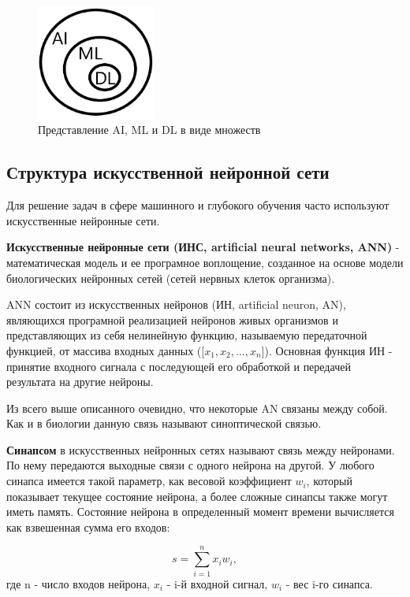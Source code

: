 \documentclass[bachelor, och, coursework]{shiza}
\begin{document}
\begin{figure}[H]
    \centering
    \includegraphics[width=0.35\textwidth]{pic/2}
    \caption{Представление AI, ML и DL в виде множеств}
    \label{fig:img1}
\end{figure}

\subsection{Структура искусственной нейронной сети}

Для решение задач в сфере машинного и глубокого обучения часто используют искусственные нейронные сети.

\textbf{Искусственные нейронные сети (ИНС, artificial neural networks, ANN)} - математическая модель и ее програмное воплощение, созданное
на основе модели биологических нейронных сетей (сетей нервных клеток организма).

ANN состоит из искусственных нейронов (ИН, artificial neuron, AN), являющихся програмной реализацией нейронов живых организмов и представляющих
из себя нелинейную функцию, называемую передаточной функцией, от массива входных данных ([$x_1, x_2, ..., x_n$]). Основная функция ИН - принятие 
входного сигнала с последующей его обработкой и передачей результата на другие нейроны.

Из всего выше описанного очевидно, что некоторые AN связаны между собой. Как и в биологии данную связь называют синоптической связью.

\textbf{Синапсом} в искусственных нейронных сетях называют связь между нейронами. По нему передаются выходные связи с одного нейрона на 
другой. У любого синапса имеется такой параметр, как весовой коэффициент $w_i$, который показывает текущее состояние нейрона, а более сложные 
синапсы также могут иметь память. Состояние нейрона в определенный момент времени вычисляется как взвешенная сумма его входов:

\begin{equation}
    s = \sum\limits_{i=1}^nx_iw_i,
\end{equation}
где n - число входов нейрона, $x_i$ - i-й входной сигнал, $w_i$ - вес i-го синапса.
\end{document}
